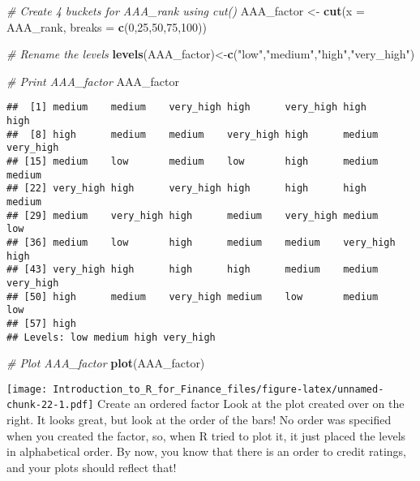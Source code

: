 \documentclass[]{article}
\newenvironment{Shaded}{\begin{snugshade}}{\end{snugshade}}
\newcommand{\KeywordTok}[1]{\textcolor[rgb]{0.13,0.29,0.53}{\textbf{#1}}}
\newcommand{\DataTypeTok}[1]{\textcolor[rgb]{0.13,0.29,0.53}{#1}}
\newcommand{\DecValTok}[1]{\textcolor[rgb]{0.00,0.00,0.81}{#1}}
\newcommand{\StringTok}[1]{\textcolor[rgb]{0.31,0.60,0.02}{#1}}
\newcommand{\CommentTok}[1]{\textcolor[rgb]{0.56,0.35,0.01}{\textit{#1}}}
\newcommand{\NormalTok}[1]{#1}
\begin{document}
\begin{Shaded}
\begin{Highlighting}[]
\CommentTok{# Create 4 buckets for AAA_rank using cut()}
\NormalTok{AAA_factor <-}\StringTok{ }\KeywordTok{cut}\NormalTok{(}\DataTypeTok{x =}\NormalTok{ AAA_rank, }\DataTypeTok{breaks =} \KeywordTok{c}\NormalTok{(}\DecValTok{0}\NormalTok{,}\DecValTok{25}\NormalTok{,}\DecValTok{50}\NormalTok{,}\DecValTok{75}\NormalTok{,}\DecValTok{100}\NormalTok{))}

\CommentTok{# Rename the levels }
\KeywordTok{levels}\NormalTok{(AAA_factor)<-}\KeywordTok{c}\NormalTok{(}\StringTok{"low"}\NormalTok{,}\StringTok{"medium"}\NormalTok{,}\StringTok{"high"}\NormalTok{,}\StringTok{"very_high"}\NormalTok{)}

\CommentTok{# Print AAA_factor}
\NormalTok{AAA_factor}
\end{Highlighting}
\end{Shaded}

\begin{verbatim}
##  [1] medium    medium    very_high high      very_high high      high     
##  [8] high      medium    medium    very_high high      medium    very_high
## [15] medium    low       medium    low       high      medium    medium   
## [22] very_high high      very_high high      high      high      medium   
## [29] medium    very_high high      medium    very_high medium    low      
## [36] medium    low       high      medium    medium    very_high high     
## [43] very_high high      high      high      medium    medium    very_high
## [50] high      medium    very_high medium    low       medium    low      
## [57] high     
## Levels: low medium high very_high
\end{verbatim}

\begin{Shaded}
\begin{Highlighting}[]
\CommentTok{# Plot AAA_factor}
\KeywordTok{plot}\NormalTok{(AAA_factor)}
\end{Highlighting}
\end{Shaded}

\texttt{[image: Introduction\_to\_R\_for\_Finance\_files/figure-latex/unnamed-chunk-22-1.pdf]}
Create an ordered factor Look at the plot created over on the right. It
looks great, but look at the order of the bars! No order was specified
when you created the factor, so, when R tried to plot it, it just placed
the levels in alphabetical order. By now, you know that there is an
order to credit ratings, and your plots should reflect that!
\end{document}
